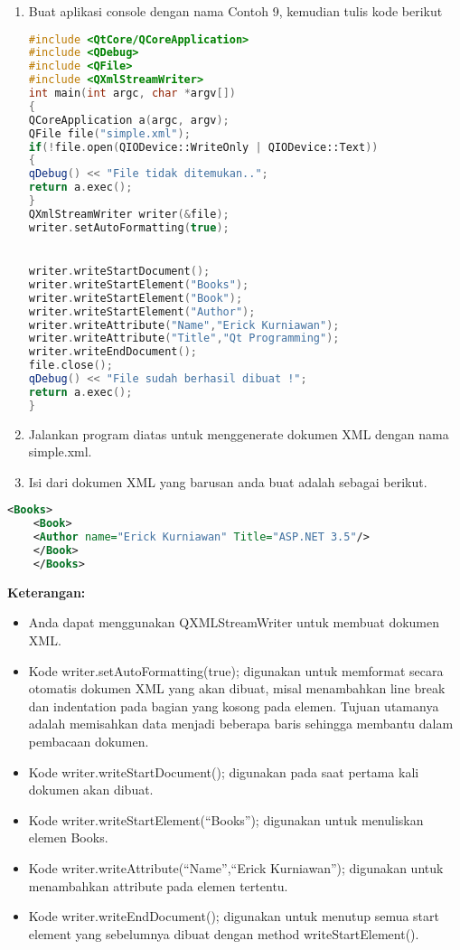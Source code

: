 \begin{enumerate}
\def\labelenumi{\arabic{enumi}.}
\item
  Buat aplikasi console dengan nama Contoh 9, kemudian tulis kode
  berikut

\begin{lstlisting}[language=c++]
#include <QtCore/QCoreApplication>
#include <QDebug>
#include <QFile>
#include <QXmlStreamWriter>
int main(int argc, char *argv[])
{
QCoreApplication a(argc, argv);
QFile file("simple.xml");
if(!file.open(QIODevice::WriteOnly | QIODevice::Text))
{
qDebug() << "File tidak ditemukan..";
return a.exec();
}
QXmlStreamWriter writer(&file);
writer.setAutoFormatting(true);


writer.writeStartDocument();
writer.writeStartElement("Books");
writer.writeStartElement("Book");
writer.writeStartElement("Author");
writer.writeAttribute("Name","Erick Kurniawan");
writer.writeAttribute("Title","Qt Programming");
writer.writeEndDocument();
file.close();
qDebug() << "File sudah berhasil dibuat !";
return a.exec();
}
\end{lstlisting}
\item
  Jalankan program diatas untuk menggenerate dokumen XML dengan nama
  simple.xml.
\item
  Isi dari dokumen XML yang barusan anda buat adalah sebagai berikut.
\end{enumerate}



\begin{lstlisting}[language=xml]
    <Books>
    <Book>
    <Author name="Erick Kurniawan" Title="ASP.NET 3.5"/>
    </Book>
    </Books>
\end{lstlisting}

\textbf{Keterangan:}

\begin{itemize}
\tightlist
\item
  Anda dapat menggunakan QXMLStreamWriter untuk membuat dokumen XML.
\item
  Kode writer.setAutoFormatting(true); digunakan untuk memformat secara
  otomatis dokumen XML yang akan dibuat, misal menambahkan line break
  dan indentation pada bagian yang kosong pada elemen. Tujuan utamanya
  adalah memisahkan data menjadi beberapa baris sehingga membantu dalam
  pembacaan dokumen.
\item
  Kode writer.writeStartDocument(); digunakan pada saat pertama kali
  dokumen akan dibuat.
\item
  Kode writer.writeStartElement(``Books''); digunakan untuk menuliskan
  elemen Books.
\item
  Kode writer.writeAttribute(``Name'',``Erick Kurniawan''); digunakan
  untuk menambahkan attribute pada elemen tertentu.
\item
  Kode writer.writeEndDocument(); digunakan untuk menutup semua start
  element yang sebelumnya dibuat dengan method writeStartElement().
\end{itemize}
